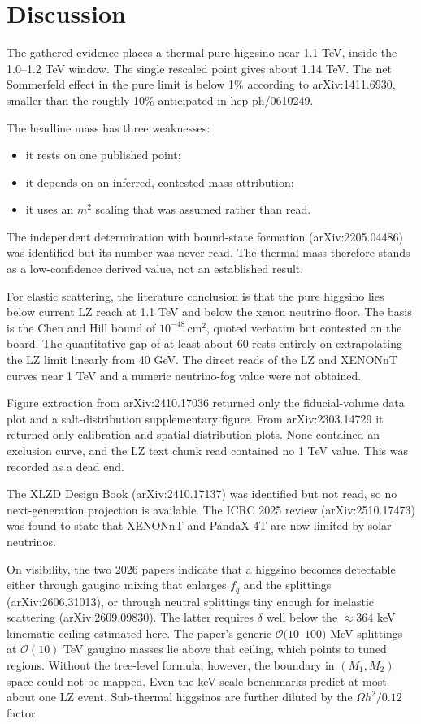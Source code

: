 \documentclass[11pt,a4paper]{article}
\begin{document}
\section{Discussion}
The gathered evidence places a thermal pure higgsino near 1.1 TeV, inside the 1.0--1.2 TeV window. The single rescaled point gives about 1.14 TeV. The net Sommerfeld effect in the pure limit is below 1\% according to arXiv:1411.6930, smaller than the roughly 10\% anticipated in hep-ph/0610249.

The headline mass has three weaknesses:
\begin{itemize}
\item it rests on one published point;
\item it depends on an inferred, contested mass attribution;
\item it uses an $m^2$ scaling that was assumed rather than read.
\end{itemize}
The independent determination with bound-state formation (arXiv:2205.04486) was identified but its number was never read. The thermal mass therefore stands as a low-confidence derived value, not an established result.

For elastic scattering, the literature conclusion is that the pure higgsino lies below current LZ reach at 1.1 TeV and below the xenon neutrino floor. The basis is the Chen and Hill bound of $10^{-48}\,\mathrm{cm^2}$, quoted verbatim but contested on the board. The quantitative gap of at least about 60 rests entirely on extrapolating the LZ limit linearly from 40 GeV. The direct reads of the LZ and XENONnT curves near 1 TeV and a numeric neutrino-fog value were not obtained.

Figure extraction from arXiv:2410.17036 returned only the fiducial-volume data plot and a salt-distribution supplementary figure. From arXiv:2303.14729 it returned only calibration and spatial-distribution plots. None contained an exclusion curve, and the LZ text chunk read contained no 1 TeV value. This was recorded as a dead end.

The XLZD Design Book (arXiv:2410.17137) was identified but not read, so no next-generation projection is available. The ICRC 2025 review (arXiv:2510.17473) was found to state that XENONnT and PandaX-4T are now limited by solar neutrinos.

On visibility, the two 2026 papers indicate that a higgsino becomes detectable either through gaugino mixing that enlarges $f_q$ and the splittings (arXiv:2606.31013), or through neutral splittings tiny enough for inelastic scattering (arXiv:2609.09830). The latter requires $\delta$ well below the $\approx 364$ keV kinematic ceiling estimated here. The paper's generic $\mathcal{O}(10$--$100)$ MeV splittings at $\mathcal{O}(10)$ TeV gaugino masses lie above that ceiling, which points to tuned regions. Without the tree-level formula, however, the boundary in $(M_1, M_2)$ space could not be mapped. Even the keV-scale benchmarks predict at most about one LZ event. Sub-thermal higgsinos are further diluted by the $\Omega h^2/0.12$ factor.
\end{document}
